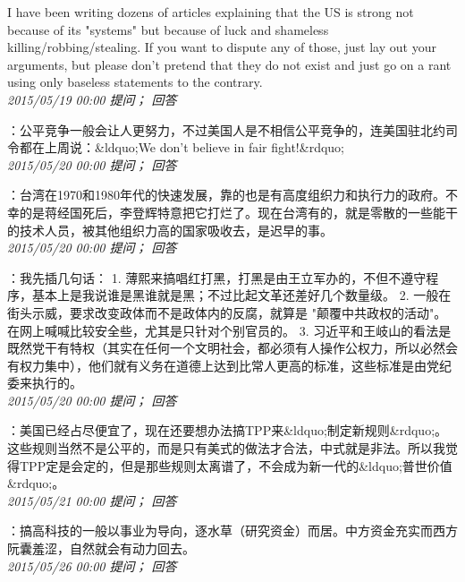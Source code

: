 \documentclass[twocolumn]{ctexart}
\begin{document}
I have been writing dozens of articles explaining that the US is strong not because of its "systems" but because of luck and shameless killing/robbing/stealing. If you want to dispute any of those, just lay out your arguments, but please don't pretend that they do not exist and just go on a rant using only baseless statements to the contrary.\\

\textit{\hfill\noindent\small 2015/05/19 00:00 提问； 回答}

：公平竞争一般会让人更努力，不过美国人是不相信公平竞争的，连美国驻北约司令都在上周说：\&ldquo;We don't believe in fair fight!\&rdquo;\\

\textit{\hfill\noindent\small 2015/05/20 00:00 提问； 回答}

：台湾在1970和1980年代的快速发展，靠的也是有高度组织力和执行力的政府。不幸的是蒋经国死后，李登辉特意把它打烂了。现在台湾有的，就是零散的一些能干的技术人员，被其他组织力高的国家吸收去，是迟早的事。\\

\textit{\hfill\noindent\small 2015/05/20 00:00 提问； 回答}

：我先插几句话：
1. 薄熙来搞唱红打黑，打黑是由王立军办的，不但不遵守程序，基本上是我说谁是黑谁就是黑；不过比起文革还差好几个数量级。
2. 一般在街头示威，要求改变政体而不是政体内的反腐，就算是 "颠覆中共政权的活动"。在网上喊喊比较安全些，尤其是只针对个别官员的。
3. 习近平和王岐山的看法是既然党干有特权（其实在任何一个文明社会，都必须有人操作公权力，所以必然会有权力集中），他们就有义务在道德上达到比常人更高的标准，这些标准是由党纪委来执行的。\\

\textit{\hfill\noindent\small 2015/05/20 00:00 提问； 回答}

：美国已经占尽便宜了，现在还要想办法搞TPP来\&ldquo;制定新规则\&rdquo;。这些规则当然不是公平的，而是只有美式的做法才合法，中式就是非法。所以我觉得TPP定是会定的，但是那些规则太离谱了，不会成为新一代的\&ldquo;普世价值\&rdquo;。\\

\textit{\hfill\noindent\small 2015/05/21 00:00 提问； 回答}

：搞高科技的一般以事业为导向，逐水草（研究资金）而居。中方资金充实而西方阮囊羞涩，自然就会有动力回去。\\

\textit{\hfill\noindent\small 2015/05/26 00:00 提问； 回答}
\end{document}
